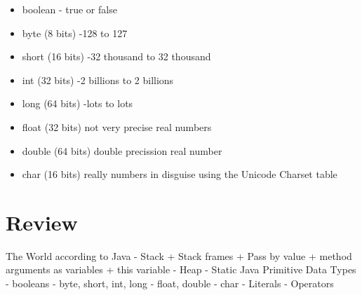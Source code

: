 \documentclass[8pt, a4paper, oneside]{extarticle}
\begin{document}
\begin{itemize}

  \item boolean - true or false

  \item byte (8 bits) -128 to 127

  \item short (16 bits) -32 thousand to 32 thousand

  \item int (32 bits) -2 billions to 2 billions

  \item long (64 bits) -lots to lots

  \item float (32 bits) not very precise real numbers

  \item double (64 bits) double precission real number

  \item char (16 bits) really numbers in disguise using the Unicode Charset table

\end{itemize}

\section{Review}

\begin{blackboard}
The World according to Java
  - Stack
    + Stack frames
    + Pass by value
    + method arguments as variables
    + this variable
  - Heap
  - Static
Java Primitive Data Types
  - booleans
  - byte, short, int, long
  - float, double
  - char
  - Literals
  - Operators
\end{blackboard}
\end{document}
